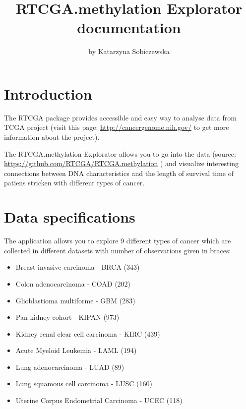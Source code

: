 \title{RTCGA.methylation Explorator documentation}
\author{by Katarzyna Sobiczewska}

\maketitle


\section{Introduction}\label{introduction}

The RTCGA package \citep{kb} provides accessible and easy way to analyse
data from TCGA project (visit this page:
\href{http://cancergenome.nih.gov/}{\url{http://cancergenome.nih.gov/}}
to get more information about the project).

The RTCGA.methylation Explorator allows you to go into the data (source:
\href{https://github.com/RTCGA/RTCGA.methylation}{\url{https://github.com/RTCGA/RTCGA.methylation}}
) and visualize interesting connections between DNA characteristics and
the length of survival time of patiens stricken with different types of
cancer.

\section{Data specifications}\label{data-specifications}

The application allows you to explore 9 different types of cancer which
are collected in different datasets with number of observations given in
braces:

\begin{itemize}
\itemsep1pt\parskip0pt
\item
  Breast invasive carcinoma - BRCA (343)
\item
  Colon adenocarcinoma - COAD (202)
\item
  Glioblastioma multiforme - GBM (283)
\item
  Pan-kidney cohort - KIPAN (973)
\item
  Kidney renal clear cell carcinoma - KIRC (439)
\item
  Acute Myeloid Leukemia - LAML (194)
\item
  Lung adenocarcinoma - LUAD (89)
\item
  Lung squamous cell carcinoma - LUSC (160)
\item
  Uterine Corpus Endometrial Carcinoma - UCEC (118)
\end{itemize}

